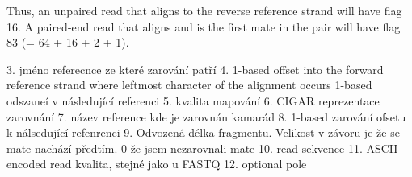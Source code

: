 \documentclass[czech,DP]{thesiskiv}
\numberwithin{equation}{section}
\begin{document}
Thus, an unpaired read that aligns to the reverse reference strand will have flag 16. A paired-end read that aligns and is the first mate in the pair will have flag 83 (= 64 + 16 + 2 + 1).

3. jméno referecnce ze které zarování patří
4. 1-based offset into the forward reference strand where leftmost character of the alignment occurs 1-based odszaneí v následující referenci 
5. kvalita mapování
6. CIGAR reprezentace zarovnání
7. název reference kde je zarovnán kamarád 
8. 1-based zarování ofsetu k nálsedující refenrenci 
9. Odvozená délka fragmentu. Velikost v závoru je že se mate nachází předtím. 0 že jsem nezarovnali mate
10. read sekvence
11. ASCII encoded read kvalita, stejné jako u FASTQ
12. optional pole
\end{document}
